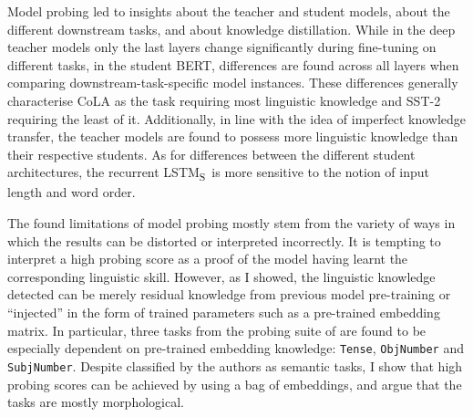 \documentclass[bsc,frontabs,singlespacing,parskip,deptreport]{infthesis}
\def\LSTMS{LSTM\textsubscript{S}}
\begin{document}
{{    %
    Model probing led to insights about the teacher and student models, about the different downstream tasks, and about knowledge distillation.
    While in the deep teacher models only the last layers change significantly during fine-tuning on different tasks, in the student BERT, differences are found across all layers when comparing downstream-task-specific model instances.
    These differences generally characterise CoLA as the task requiring most linguistic knowledge and SST-2 requiring the least of it.
    Additionally, in line with the idea of imperfect knowledge transfer, the teacher models are found to possess more linguistic knowledge than their respective students.
    As for differences between the different student architectures, the recurrent \LSTMS~is more sensitive to the notion of input length and word order.

    The found limitations of model probing mostly stem from the variety of ways in which the results can be distorted or interpreted incorrectly.
    It is tempting to interpret a high probing score as a proof of the model having learnt the corresponding linguistic skill.
    However, as I showed, the linguistic knowledge detected can be merely residual knowledge from previous model pre-training or ``injected'' in the form of trained parameters such as a pre-trained embedding matrix.
    In particular, three tasks from the probing suite of \citet{Conneau_2018} are found to be especially dependent on pre-trained embedding knowledge: \verb|Tense|, \verb|ObjNumber| and \verb|SubjNumber|. Despite classified by the authors as semantic tasks, I show that high probing scores can be achieved by using a bag of embeddings, and argue that the tasks are mostly morphological.

}}
\end{document}

